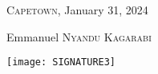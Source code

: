 \documentclass[10pt,a4paper,oneside]{article}
\begin{document}
\vspace{1cm}
\begin{flushright}
	\textsc{Capetown}, January 31, 2024
\end{flushright}

                \begin{flushright}
                	
                	Emmanuel \textsc{Nyandu Kagarabi}
                	
                	\texttt{[image: SIGNATURE3]}
                		
         
                	
                \end{flushright}
        
        
        
  	
\end{document}
